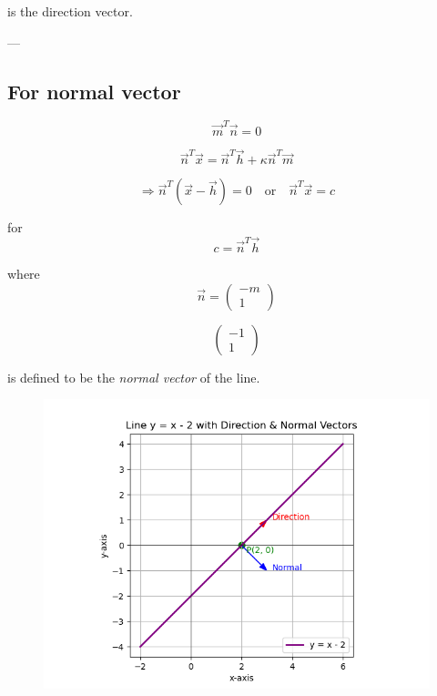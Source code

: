 \documentclass[journal]{IEEEtran}
\begin{document}
is the direction vector.  

---

\subsection*{ For normal vector}

\begin{equation}
\vec{m}^T \vec{n} = 0
\tag{4.2.18.5}
\end{equation}

\[
\vec{n}^T \vec{x} = \vec{n}^T \vec{h} + \kappa \vec{n}^T \vec{m}
\tag{4.2.18.6}
\]

\[
\Rightarrow \vec{n}^T (\vec{x} - \vec{h}) = 0
\quad \text{or} \quad
\vec{n}^T \vec{x} = c
\tag{4.2.18.7}
\]

for
\begin{equation}
c = \vec{n}^T \vec{h}
\tag{4.2.18.8}
\end{equation}

where
\[
\vec{n} =
\begin{pmatrix}
-m \\ 1
\end{pmatrix}
\tag{4.2.18.9}
\]

\[
\begin{pmatrix}
-1 \\ 1
\end{pmatrix}
\]




is defined to be the \textit{normal vector} of the line.

\begin{figure}[H]
\begin{center}
\includegraphics[width=0.6\columnwidth]{Figs/Fig1.png}
\end{center}
\caption{}
\label{fig:Fig.1}
\end{figure}
\end{document}
